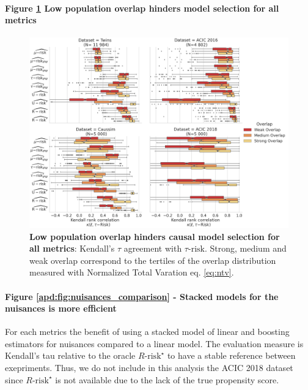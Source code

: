 \documentclass{report}
\begin{document}
\begin{appendices}
  \paragraph{Figure \ref{apd:fig:all_datasets_overlap_effect} Low population
    overlap hinders model selection for all metrics}



  \begin{figure}
    \centering
    \includegraphics[width=\textwidth]{img/chapter_5/_2_overlap_influence_overlap_by_bin_comparaison_kendall_by_Dataset.png}
    \hfill
    \caption{\textbf{Low population overlap hinders causal model selection for all
        metrics}:
      Kendall's $\tau$ agreement with $\tau\text{-risk}$. Strong, medium and weak overlap
      correspond
      to the tertiles of the overlap distribution measured with Normalized Total
      Varation eq. \ref{eq:ntv}.}\label{apd:fig:all_datasets_overlap_effect}
  \end{figure}


  \paragraph{Figure \ref{apd:fig:nuisances_comparison} - Stacked models for the nuisances is more efficient}
  For each metrics the benefit of
  using a stacked model of linear and boosting estimators for nuisances compared
  to a linear model. The evaluation measure is Kendall's tau relative to the
  oracle $R\text{-risk}^{\star}$ to have a stable reference between exepriments.
  Thus, we do not include in this analysis the ACIC 2018 dataset since
  $R\text{-risk}^{\star}$ is not available due to the lack of the true propensity
  score.


\end{appendices}
\end{document}
